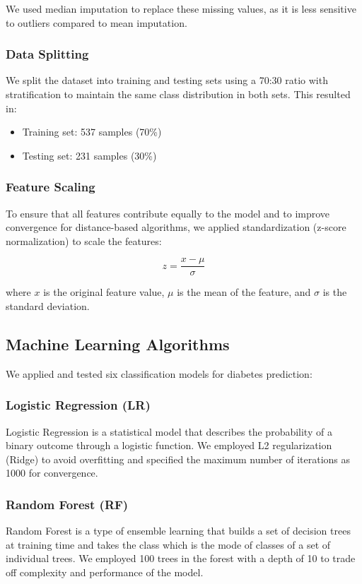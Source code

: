 \documentclass[conference]{IEEEtran}
\begin{document}
\begin{itemize}
We used median imputation to replace these missing values, as it is less sensitive to outliers compared to mean imputation.

\subsubsection{Data Splitting}
We split the dataset into training and testing sets using a 70:30 ratio with stratification to maintain the same class distribution in both sets. This resulted in:
\begin{itemize}
    \item Training set: 537 samples (70\%)
    \item Testing set: 231 samples (30\%)
\end{itemize}

\subsubsection{Feature Scaling}
To ensure that all features contribute equally to the model and to improve convergence for distance-based algorithms, we applied standardization (z-score normalization) to scale the features:

\begin{equation}
z = \frac{x - \mu}{\sigma}
\end{equation}

where $x$ is the original feature value, $\mu$ is the mean of the feature, and $\sigma$ is the standard deviation.

\subsection{Machine Learning Algorithms}
We applied and tested six classification models for diabetes prediction:

\subsubsection{Logistic Regression (LR)}
Logistic Regression is a statistical model that describes the probability of a binary outcome through a logistic function. We employed L2 regularization (Ridge) to avoid overfitting and specified the maximum number of iterations as 1000 for convergence.

\subsubsection{Random Forest (RF)}
Random Forest is a type of ensemble learning that builds a set of decision trees at training time and takes the class which is the mode of classes of a set of individual trees. We employed 100 trees in the forest with a depth of 10 to trade off complexity and performance of the model.


\end{itemize}
\end{document}
